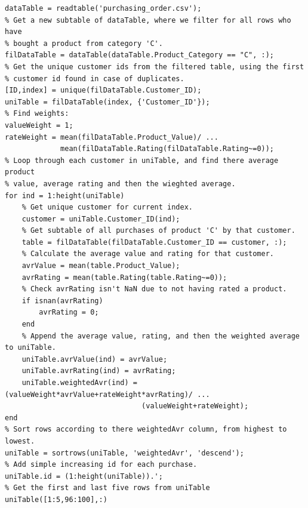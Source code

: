 \documentclass[12pt]{article}
\begin{document}
\begin{lstlisting}[caption={Question 3 full code},label={3_fullCode}]
% Read file and format into table.
dataTable = readtable('purchasing_order.csv');
% Get a new subtable of dataTable, where we filter for all rows who have
% bought a product from category 'C'.
filDataTable = dataTable(dataTable.Product_Category == "C", :);
% Get the unique customer ids from the filtered table, using the first
% customer id found in case of duplicates.
[ID,index] = unique(filDataTable.Customer_ID);
uniTable = filDataTable(index, {'Customer_ID'});
% Find weights:
valueWeight = 1;
rateWeight = mean(filDataTable.Product_Value)/ ...
             mean(filDataTable.Rating(filDataTable.Rating~=0));
% Loop through each customer in uniTable, and find there average product
% value, average rating and then the wieghted average.
for ind = 1:height(uniTable)
    % Get unique customer for current index.
    customer = uniTable.Customer_ID(ind);
    % Get subtable of all purchases of product 'C' by that customer.
    table = filDataTable(filDataTable.Customer_ID == customer, :);
    % Calculate the average value and rating for that customer.
    avrValue = mean(table.Product_Value);
    avrRating = mean(table.Rating(table.Rating~=0));
    % Check avrRating isn't NaN due to not having rated a product.
    if isnan(avrRating)
        avrRating = 0;
    end
    % Append the average value, rating, and then the weighted average to uniTable.
    uniTable.avrValue(ind) = avrValue;
    uniTable.avrRating(ind) = avrRating;
    uniTable.weightedAvr(ind) = (valueWeight*avrValue+rateWeight*avrRating)/ ...
                                (valueWeight+rateWeight);
end
% Sort rows according to there weightedAvr column, from highest to lowest.
uniTable = sortrows(uniTable, 'weightedAvr', 'descend');
% Add simple increasing id for each purchase.
uniTable.id = (1:height(uniTable)).';
% Get the first and last five rows from uniTable
uniTable([1:5,96:100],:)
\end{lstlisting}
\end{document}
